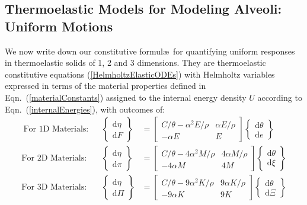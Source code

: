 \subsection{Thermoelastic Models for Modeling Alveoli: Uniform Motions}

We now write down our constitutive formul\ae\ for quantifying uniform responses in thermo\-elastic solids of 1, 2 and 3 dimensions.  They are thermo\-elastic constitutive equations (\ref{HelmholtzElasticODEs}) with Helmholtz variables expressed in terms of the material properties defined in Eqn.~(\ref{materialConstants}) assigned to the internal energy density $U$ according to Eqn.~(\ref{internalEnergies}), with outcomes of:
\begin{subequations}
    \label{HelmholtzCEs}
    \begin{align}\
    \text{For 1D Materials:} & &
    \left\{ \begin{matrix}
    \mathrm{d} \eta \\ \mathrm{d} F
    \end{matrix} \right\} & = \begin{bmatrix}
    C / \theta - \alpha^2 E / \rho& 
    \alpha E / \rho \\
    -\alpha E & E
    \end{bmatrix} \left\{ \begin{matrix}
    \mathrm{d} \theta \\ \mathrm{d} e
    \end{matrix} \right\} \label{Helmholtz1D} \\
    \text{For 2D Materials:} & &
    \left\{ \begin{matrix}
    \mathrm{d} \eta \\ \mathrm{d} \pi
    \end{matrix} \right\} & = \begin{bmatrix}
    C / \theta - 4 \alpha^2 M / \rho & 
    4 \alpha M / \rho \\
    -4 \alpha M & 4 M
    \end{bmatrix} \left\{ \begin{matrix}
    \mathrm{d} \theta \\ \mathrm{d} \xi
    \end{matrix} \right\} \label{Helmholtz2D} \\
    \text{For 3D Materials:} & &
    \left\{ \begin{matrix}
    \mathrm{d} \eta \\ \mathrm{d} \Pi
    \end{matrix} \right\} & = \begin{bmatrix}
    C / \theta - 9 \alpha^2 K / \rho & 
    9 \alpha K / \rho \\
    -9 \alpha K & 9 K
    \end{bmatrix} \left\{ \begin{matrix}
    \mathrm{d} \theta \\ \mathrm{d} \Xi
    \end{matrix} \right\} \label{Helmholtz3D}
    \end{align}
\end{subequations}
